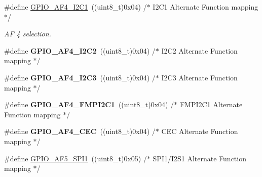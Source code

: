 \begin{DoxyCompactItemize}
\item 
\#define \hyperlink{group___g_p_i_o___alternate__function__selection_ga756e49236633954d1e86cc01c03fb518}{G\+P\+I\+O\+\_\+\+A\+F4\+\_\+\+I2\+C1}~((uint8\+\_\+t)0x04)  /$\ast$ I2\+C1 Alternate Function mapping $\ast$/\hypertarget{group___g_p_i_o___alternate__function__selection_ga756e49236633954d1e86cc01c03fb518}{}\label{group___g_p_i_o___alternate__function__selection_ga756e49236633954d1e86cc01c03fb518}

\begin{DoxyCompactList}\small\item\em AF 4 selection. \end{DoxyCompactList}\item 
\#define {\bfseries G\+P\+I\+O\+\_\+\+A\+F4\+\_\+\+I2\+C2}~((uint8\+\_\+t)0x04)  /$\ast$ I2\+C2 Alternate Function mapping $\ast$/\hypertarget{group___g_p_i_o___alternate__function__selection_gac0a21510acee65b71f4f9da497de8834}{}\label{group___g_p_i_o___alternate__function__selection_gac0a21510acee65b71f4f9da497de8834}

\item 
\#define {\bfseries G\+P\+I\+O\+\_\+\+A\+F4\+\_\+\+I2\+C3}~((uint8\+\_\+t)0x04)  /$\ast$ I2\+C3 Alternate Function mapping $\ast$/\hypertarget{group___g_p_i_o___alternate__function__selection_ga2ac25d0b23bd43deeed4f4201e1cc275}{}\label{group___g_p_i_o___alternate__function__selection_ga2ac25d0b23bd43deeed4f4201e1cc275}

\item 
\#define {\bfseries G\+P\+I\+O\+\_\+\+A\+F4\+\_\+\+F\+M\+P\+I2\+C1}~((uint8\+\_\+t)0x04)  /$\ast$ F\+M\+P\+I2\+C1 Alternate Function mapping $\ast$/\hypertarget{group___g_p_i_o___alternate__function__selection_gae86952f3f334d8bef2fee17e1b8ba5ff}{}\label{group___g_p_i_o___alternate__function__selection_gae86952f3f334d8bef2fee17e1b8ba5ff}

\item 
\#define {\bfseries G\+P\+I\+O\+\_\+\+A\+F4\+\_\+\+C\+EC}~((uint8\+\_\+t)0x04)  /$\ast$ C\+E\+C Alternate Function mapping  $\ast$/\hypertarget{group___g_p_i_o___alternate__function__selection_ga23fd0eb8bcd3c2b58329c17c85d5eb78}{}\label{group___g_p_i_o___alternate__function__selection_ga23fd0eb8bcd3c2b58329c17c85d5eb78}

\item 
\#define \hyperlink{group___g_p_i_o___alternate__function__selection_gafb369e90efa49bcc298fd354b79cf11a}{G\+P\+I\+O\+\_\+\+A\+F5\+\_\+\+S\+P\+I1}~((uint8\+\_\+t)0x05)  /$\ast$ S\+P\+I1/\+I2\+S1 Alternate Function mapping   $\ast$/\hypertarget{group___g_p_i_o___alternate__function__selection_gafb369e90efa49bcc298fd354b79cf11a}{}\label{group___g_p_i_o___alternate__function__selection_gafb369e90efa49bcc298fd354b79cf11a}


\end{DoxyCompactItemize}
